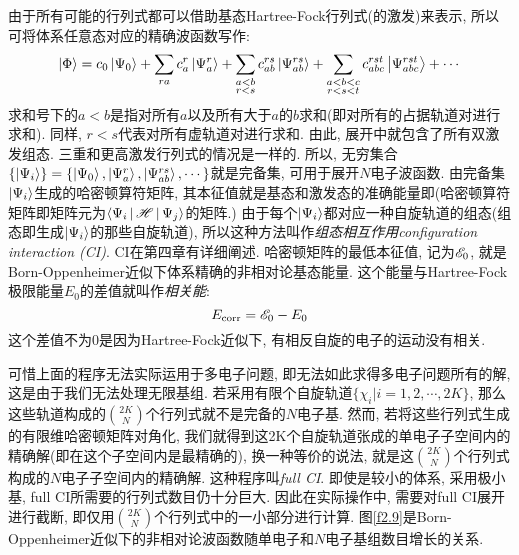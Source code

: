 由于所有可能的行列式都可以借助基态Hartree-Fock行列式(的激发)来表示, 所以可将体系任意态对应的精确波函数写作:
\begin{equation}
\Ket{\Phi}=c_0\Ket{\Psi_0}+\sum_{ra}c_a^r\Ket{\Psi_a^r}+\sum_{\substack{a<b\\r<s}}c_{ab}^{rs}\Ket{\Psi_{ab}^{rs}}+\sum_{\substack{a<b<c\\r<s<t}}c_{abc}^{rst}\Ket{\Psi_{abc}^{rst}}+\cdots
\end{equation}
求和号下的$a<b$是指对所有$a$以及所有大于$a$的$b$求和(即对所有的占据轨道对进行求和). 同样, $r<s$代表对所有虚轨道对进行求和. 由此, 展开中就包含了所有双激发组态. 三重和更高激发行列式的情况是一样的. 所以, 无穷集合$\{\Ket{\Psi_i} \}=\{\Ket{\Psi_0}, \Ket{\Psi_a^r}, \Ket{\Psi_{ab}^{rs}}, \cdots \}$就是完备集, 可用于展开$N$电子波函数. 由完备集$\Ket{\Psi_i}$生成的哈密顿算符矩阵, 其本征值就是基态和激发态的准确能量即(哈密顿算符矩阵即矩阵元为$\Braket{\Psi_i|\mathscr{H}|\Psi_j
}$的矩阵.) 由于每个$\Ket{\Psi_i}$都对应一种自旋轨道的组态(组态即生成$\Ket{\Psi_i}$的那些自旋轨道), 所以这种方法叫作\emph{组态相互作用configuration interaction ({CI\rm})}. CI在第四章有详细阐述. 哈密顿矩阵的最低本征值, 记为$\mathscr{E}_0$, 就是Born-Oppenheimer近似下体系精确的非相对论基态能量. 这个能量与Hartree-Fock极限能量$E_0$的差值就叫作\emph{相关能}:
\begin{equation}
E_{\mathrm{corr}}=\mathscr{E}_0-E_0
\end{equation} 
这个差值不为0是因为Hartree-Fock近似下, 有相反自旋的电子的运动没有相关.

可惜上面的程序无法实际运用于多电子问题, 即无法如此求得多电子问题所有的解, 这是由于我们无法处理无限基组. 若采用有限个自旋轨道$\{\chi_i|i=1,2,\cdots,2K \}$, 那么这些轨道构成的$\binom{2K}{N}$个行列式就不是完备的$N$电子基. 然而, 若将这些行列式生成的有限维哈密顿矩阵对角化, 我们就得到这2K个自旋轨道张成的单电子子空间内的精确解(即在这个子空间内是最精确的), 换一种等价的说法, 就是这$\binom{2K}{N}$个行列式构成的$N$电子子空间内的精确解. 这种程序叫\emph{full CI}. 即使是较小的体系, 采用极小基, full CI所需要的行列式数目仍十分巨大. 因此在实际操作中, 需要对full CI展开进行截断, 即仅用$\binom{2K}{N}$个行列式中的一小部分进行计算. 图\ref{f2.9}是Born-Oppenheimer近似下的非相对论波函数随单电子和$N$电子基组数目增长的关系.


